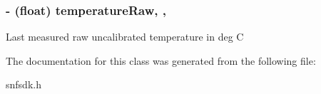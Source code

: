 \subsubsection[{temperature\+Raw}]{\setlength{\rightskip}{0pt plus 5cm}-\/ (float) temperature\+Raw\hspace{0.3cm}{\ttfamily [read]}, {\ttfamily [nonatomic]}, {\ttfamily [assign]}}\label{interface_le_snf_device_a8cdcdf37d487556008e5421dc353ac3a}
Last measured raw uncalibrated temperature in deg C 

The documentation for this class was generated from the following file\+:\begin{DoxyCompactItemize}
\item 
snfsdk.\+h\end{DoxyCompactItemize}
